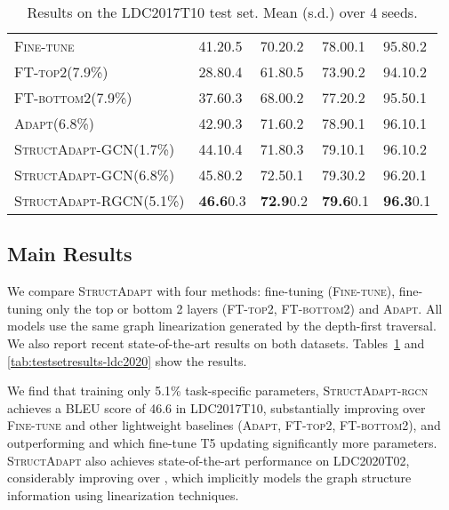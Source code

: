 \documentclass[11pt]{article}
\newcommand{\graphadapter}{{\small\textsc{StructAdapt}}\xspace}
\newcommand{\graphadapterrgcn}{{\small\textsc{StructAdapt-rgcn}}\xspace}
\newcommand{\vanilladapter}{{\small\textsc{Adapt}}\xspace}
\newcommand{\finetune}{{\small\textsc{Fine-tune}}\xspace}
\newcommand{\finetunetop}{{\small\textsc{FT-top2}}\xspace}
\newcommand{\finetunebottom}{{\small\textsc{FT-bottom2}}\xspace}
\begin{document}
\begin{table}[t]
{{\begin{tabular}{@{\hspace*{1mm}}l@{\hspace*{3mm}}l@{\hspace*{3mm}}l@{\hspace*{3mm}}l@{\hspace*{3mm}}l@{\hspace*{1mm}}}
\midrule
\finetune & 41.2{\small 0.5} & 70.2{\small 0.2}& 78.0{\small 0.1} &95.8{\small 0.2}\\
\finetunetop{\small(7.9\%)} & 28.8{\small 0.4} & 61.8{\small 0.5} & 73.9{\small 0.2} & 94.1{\small 0.2}\\
\finetunebottom{\small(7.9\%)} & 37.6{\small 0.3} & 68.0{\small 0.2} & 77.2{\small 0.2} & 95.5{\small 0.1}\\
\vanilladapter{\small(6.8\%)} & 42.9{\small 0.3} & 71.6{\small 0.2} & 78.9{\small 0.1} & 96.1{\small 0.1}\\
\graphadapter{\small-GCN(1.7\%)} & 44.1{\small 0.4} & 71.8{\small 0.3} & 79.1{\small 0.1} & 96.1{\small 0.2}\\
\graphadapter{\small-GCN(6.8\%)} & 45.8{\small 0.2} & 72.5{\small 0.1} & 79.3{\small 0.2} & 96.2{\small 0.1}\\
\graphadapter{\small-RGCN(5.1\%)} & \textbf{46.6}{\small 0.3} & \textbf{72.9}{\small 0.2} &\textbf{79.6}{\small 0.1} & \textbf{96.3}{\small 0.1}\\
\bottomrule
\end{tabular}}}
\caption{Results on the LDC2017T10 test set. Mean (s.d.) over 4 seeds.}
\label{tab:testsetresults}
\end{table}


\subsection{Main Results}

We compare \graphadapter with four methods: fine-tuning (\finetune), fine-tuning only the top or bottom 2 layers (\finetunetop, \finetunebottom) and \vanilladapter. All models use the same graph linearization generated by the depth-first traversal. We also report recent state-of-the-art results on both datasets. Tables~\ref{tab:testsetresults} and \ref{tab:testsetresults-ldc2020} show the results.
 

We find that training only 5.1\% task-specific parameters, \graphadapterrgcn achieves a BLEU score of 46.6 in LDC2017T10, substantially improving over \finetune and other lightweight baselines (\vanilladapter, \finetunetop, \finetunebottom), and outperforming \citet{ribeiro2020investigating} and \citet{hoyle2020promoting} which fine-tune T5 updating significantly more parameters. \graphadapter also achieves state-of-the-art performance on LDC2020T02, considerably improving over \citet{Micheleamr}, which implicitly models the graph structure information using linearization techniques.
\end{document}
